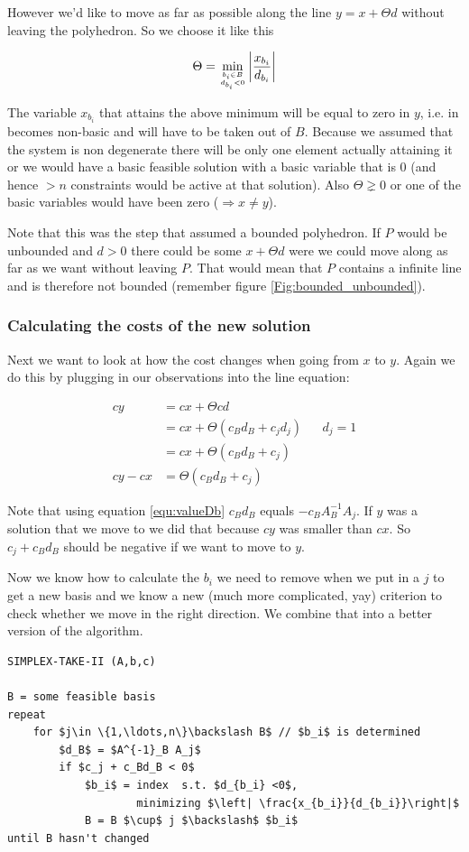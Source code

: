 However we'd like to move as far as possible along the line $y=x+\Theta d$ without leaving the polyhedron. So we choose it like this

\[\Theta = \min_{{b_i\in B}\atop {d_{b_i} <0}} \left| \frac{x_{b_i}}{d_{b_i}}\right |\]

The variable $x_{b_i}$ that attains the above minimum will be equal to zero in $y$, i.e. in becomes non-basic and will have to be taken out of $B$. Because we assumed that the system is non degenerate there will be only one element actually attaining it or we would have a basic feasible solution with a basic variable that is 0 (and hence $>n$ constraints would be active at that solution). Also $\Theta \gneq 0$ or one of the basic variables would have been zero ($\Rightarrow x\neq y$).

Note that this was the step that assumed a bounded polyhedron. If $P$ would be unbounded and $d>0$ there could be some $x+\Theta d$ were we could move along as far as we want without leaving $P$. That would mean that $P$ contains a infinite line and is therefore not bounded (remember figure \ref{Fig:bounded_unbounded}).

\subsubsection*{Calculating the costs of the new solution}
Next we want to look at how the cost changes when going from $x$ to $y$. Again we do this by plugging in our observations into the line equation:

\begin{align*}
cy &= cx + \Theta cd\\
    &= cx + \Theta (c_Bd_B + c_jd_j) &&d_j=1\\
    &= cx + \Theta (c_Bd_B + c_j)\\
cy - cx &= \Theta (c_Bd_B +c_j)
\end{align*}

Note that using equation \ref{equ:valueDb} $c_Bd_B$ equals $- c_B A^{-1}_B A_j$.
If $y$ was a solution that we move to we did that because $cy$ was smaller than $cx$. So $c_j + c_Bd_B$ should be negative if we want to move to $y$. 

Now we know how to calculate the $b_i$ we need to remove when we put in a $j$ to get a new basis and we know a new (much more complicated, yay) criterion to check whether we move in the right direction. We combine that into a better version of the algorithm.

\begin{center}
\begin{lstlisting}
SIMPLEX-TAKE-II (A,b,c)

B = some feasible basis
repeat 
    for $j\in \{1,\ldots,n\}\backslash B$ // $b_i$ is determined
        $d_B$ = $A^{-1}_B A_j$
        if $c_j + c_Bd_B < 0$
            $b_i$ = index  s.t. $d_{b_i} <0$, 
                    minimizing $\left| \frac{x_{b_i}}{d_{b_i}}\right|$
            B = B $\cup$ j $\backslash$ $b_i$
until B hasn't changed
\end{lstlisting}
\end{center}


